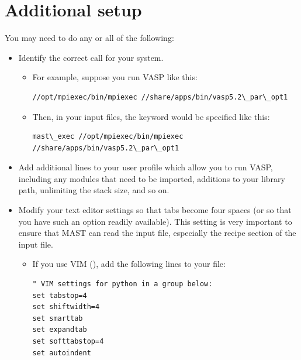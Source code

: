 \documentclass[letterpaper,10pt,english]{sphinxmanual}
\begin{document}
\section{Additional setup}
\label{1_0_installation:id3}\label{1_0_installation:additional-setup}
You may need to do any or all of the following:
\begin{itemize}
\item {} 
Identify the correct  call for your system.
\begin{itemize}
\item {} 
For example, suppose you run VASP like this:

\begin{Verbatim}[commandchars=\\\{\}]
//opt/mpiexec/bin/mpiexec //share/apps/bin/vasp5.2\_par\_opt1
\end{Verbatim}

\item {} 
Then, in your input files, the  keyword would be specified like this:

\begin{Verbatim}[commandchars=\\\{\}]
mast\_exec //opt/mpiexec/bin/mpiexec //share/apps/bin/vasp5.2\_par\_opt1
\end{Verbatim}

\end{itemize}

\item {} 
Add additional lines to your user profile which allow you to run VASP, including any modules that need to be imported, additions to your library path, unlimiting the stack size, and so on.

\item {} 
Modify your text editor settings so that tabs become four spaces (or so that you have such an option readily available). This setting is very important to ensure that MAST can read the input file, especially the recipe section of the input file.
\begin{itemize}
\item {} 
If you use VIM (), add the following lines to your  file:

\begin{Verbatim}[commandchars=\\\{\}]
" VIM settings for python in a group below:
set tabstop=4
set shiftwidth=4
set smarttab
set expandtab
set softtabstop=4
set autoindent
\end{Verbatim}

\end{itemize}

\end{itemize}
\end{document}

